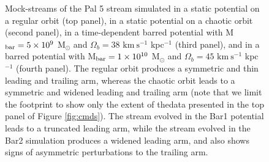\documentclass[twocolumn]{aastex62}
\newcommand{\kms}{\ensuremath{\textrm{km}~\textrm{s}^{-1}}}
\begin{document}
\begin{figure}
\caption{Mock-streams of the Pal 5 stream simulated in a static potential on a regular orbit (top panel), in a static potential on a chaotic orbit (second panel), in a time-dependent barred potential with M$_{\rm bar} = 5\times 10^9$ M$_{\odot}$ and $\Omega_b = 38$ $\kms$ kpc$^{-1}$ (third panel), and in a barred potential with M$_{\rm bar} = 1\times 10^{10}$ M$_{\odot}$ and $\Omega_b = 45$ $\kms$ kpc$^{-1}$ (fourth panel). The regular orbit produces a symmetric and thin leading and trailing arm,  whereas the chaotic orbit leads to a symmetric and widened leading and trailing arm (note that we limit the footprint to show  only the extent of thedata presented in the top panel of Figure \ref{fig:cmds}). The stream evolved in the Bar1 potential leads to a truncated leading arm, while the stream evolved in the Bar2 simulation produces a widened leading arm, and also shows signs of asymmetric perturbations to the trailing arm. }
\label{fig:sims}
\end{figure}
\end{document}
